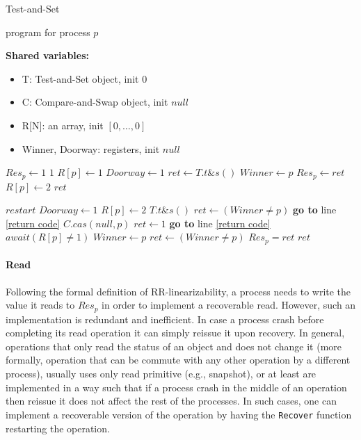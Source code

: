 \begin{varalgorithm}{Test-and-Set}
	\caption{program for process $p$}
	\label{alg:recoverable-TAS}
	
	\hspace*{\algorithmicindent} \textbf{Shared variables:}
	\begin{itemize}[noitemsep,topsep=0pt]
		\item T: Test-and-Set object, init $0$
		\item C: Compare-and-Swap object, init $null$
		\item R[N]: an array, init $[0,\ldots,0]$
		\item Winner, Doorway: registers, init $null$
	\end{itemize}
	
	\begin{multicols}{2}
	\begin{algorithmic}[1]
			\State $Res_p \gets 1$
			\State \Return $1$
		\EndIf
		\State $R[p] \gets 1$
		\State $Doorway \gets 1$
		\State $ret \gets T.t\&s()$
			\State $Winner \gets p$
		\EndIf
		\State $Res_p \gets ret$
		\State $R[p] \gets 2$
		\State \Return $ret$
		\EndProcedure
		
		\columnbreak
		
			\State $restart$
		\EndIf
		\State $Doorway \gets 1$
		\State $R[p] \gets 2$
		\State $T.t\&s()$
			\State $ret \gets (Winner \neq p)$
			\State \textbf{go to} line \ref{return code}
		\EndIf
		\State $C.cas(null,p)$
			\State $ret \gets 1$
			\State \textbf{go to} line \ref{return code}
		\EndIf
			\State $await(R[p] \neq 1)$
		\EndFor
			\State $Winner \gets p$
		\EndIf
		\State $ret \gets (Winner \neq p)$
		\State $Res_p = ret$ \label{return code}
		\State \Return $ret$
		\EndProcedure
	\end{algorithmic}
\end{multicols}
\end{varalgorithm}


\paragraph*{Read}

Following the formal definition of RR-linearizability, a process needs to write the value it reads to $Res_p$ in order to implement a recoverable read. However, such an implementation is redundant and inefficient. In case a process crash before completing its read operation it can simply reissue it upon recovery.
In general, operations that only read the status of an object and does not change it (more formally, operation that can be commute with any other operation by a different process), usually uses only read primitive (e.g., snapshot), or at least are implemented in a way such that if a process crash in the middle of an operation then reissue it does not affect the rest of the processes. In such cases, one can implement a recoverable version of the operation by having the \texttt{Recover} function restarting the operation.

